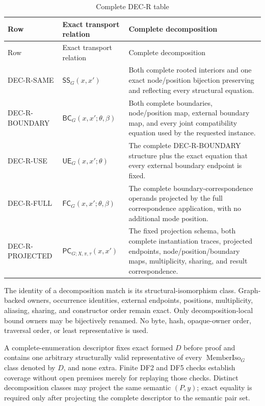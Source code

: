 \documentclass[11pt,twoside]{article}
\begin{document}
\begin{longtable}{>{\raggedright\arraybackslash}p{}
                  >{\raggedright\arraybackslash}p{}
                  >{\raggedright\arraybackslash}p{}}
\caption{Complete DEC-R table}\label{tab:decr}\\
\toprule
Row & Exact transport relation & Complete decomposition\\
\midrule
\endfirsthead%
\toprule
Row & Exact transport relation & Complete decomposition\\
\midrule
\endhead%
DEC-R-SAME &
\(\mathsf{SS}_G(x,x')\) &
Both complete rooted interiors and one exact node/position bijection preserving
and reflecting every structural equation.\\
DEC-R-BOUNDARY &
\(\mathsf{BC}_G(x,x';\theta,\beta)\) &
Both complete boundaries, node/position map, external boundary map, and every
joint compatibility equation used by the requested instance.\\
DEC-R-USE &
\(\mathsf{UE}_G(x,x';\theta)\) &
The complete DEC-R-BOUNDARY structure plus the exact equation that every external
boundary endpoint is fixed.\\
DEC-R-FULL &
\(\mathsf{FC}_G(x,x';\theta,\beta)\) &
The complete boundary-correspondence operands projected by the full
correspondence application, with no additional mode position.\\
DEC-R-PROJECTED &
\(\mathsf{PC}_{G;X,\pi,\tau}(x,x')\) &
The fixed projection schema, both complete instantiation traces, projected
endpoints, node/position/boundary maps, multiplicity, sharing, and result
correspondence.\\
\bottomrule
\end{longtable}

The identity of a decomposition match is its structural-isomorphism class.
Graph-backed owners, occurrence identities, external endpoints, positions,
multiplicity, aliasing, sharing, and constructor order remain exact.  Only
decomposition-local bound owners may be bijectively renamed.  No byte, hash,
opaque-owner order, traversal order, or least representative is used.

A complete-enumeration descriptor fixes exact formed \(D\) before proof and
contains one arbitrary structurally valid representative of every
\(\operatorname{MemberIso}_G\) class denoted by \(D\), and none extra.  Finite
DF2 and DF5 checks establish coverage without open premises merely for replaying
those checks.  Distinct decomposition classes may project the same semantic
\((P,y)\); exact equality is required only after projecting the complete descriptor
to the semantic pair set.
\end{document}
